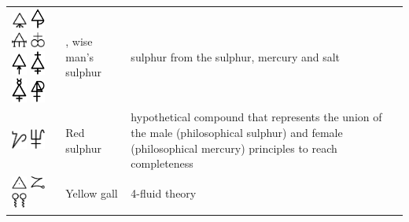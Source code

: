 \documentclass[british,final,landscape]{scrartcl}
\begin{document}
\begin{refsection}
\begin{supertabular}{p{0.3\textwidth}p{0.34\textwidth}p{0.34\textwidth}}
  \includegraphics[width=5mm]{Concepts/WiseMansSulphur} \includegraphics[width=5mm]{Concepts/WiseMansSulphur2} \includegraphics[width=5mm]{Concepts/WiseMansSulphur3} \includegraphics[width=5mm]{Concepts/WiseMansSulphur4} \includegraphics[width=5mm]{Concepts/WiseMansSulphur5} \includegraphics[width=5mm]{Concepts/WiseMansSulphur6} \includegraphics[width=5mm]{Concepts/WiseMansSulphur7} \includegraphics[width=5mm]{Concepts/WiseMansSulphur8} & , wise man's sulphur & sulphur from the  sulphur, mercury and salt \\
  \includegraphics[width=5mm]{Concepts/RedSulphur} \includegraphics[width=5mm]{Concepts/RedSulphur2} & Red sulphur & hypothetical compound that represents the union of the male (philosophical sulphur) and female (philosophical mercury) principles to reach completeness  \\
  \includegraphics[width=5mm]{Concepts/YellowGall} \includegraphics[width=5mm]{Concepts/YellowGall2} \includegraphics[width=5mm]{Concepts/YellowGall3} & Yellow gall & 4-fluid theory \\
  \end{supertabular}


\end{refsection}
\end{document}
